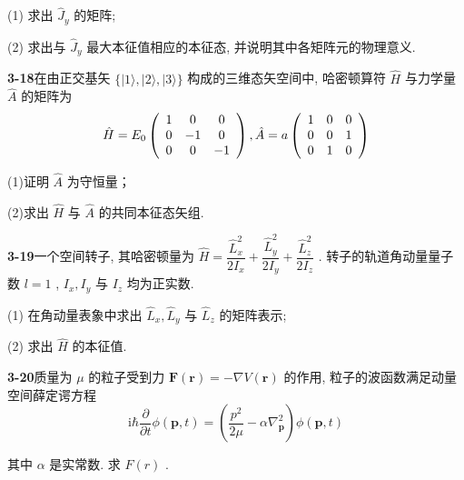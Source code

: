 (1) 求出 $\displaystyle \hat{J}_y$ 的矩阵;

(2) 求出与 $\displaystyle \hat{J}_y$ 最大本征值相应的本征态, 并说明其中各矩阵元的物理意义.

\vfill

\newpage

\textbf{3-18}\quad 在由正交基矢 $\displaystyle \{|1\rangle, |2\rangle, |3\rangle\}$ 构成的三维态矢空间中, 哈密顿算符 $\displaystyle \hat{H}$ 与力学量 $\displaystyle \hat{A}$ 的矩阵为
$$
\hat {H} = E _ {0} \left( \begin{array}{c c c} 1 & 0 & 0 \\ 0 & - 1 & 0 \\ 0 & 0 & - 1 \end{array} \right), \hat {A} = a \left( \begin{array}{c c c} 1 & 0 & 0 \\ 0 & 0 & 1 \\ 0 & 1 & 0 \end{array} \right)
$$

(1)证明 $\displaystyle \hat{A}$ 为守恒量；

(2)求出 $\displaystyle \hat{H}$ 与 $\displaystyle \hat{A}$ 的共同本征态矢组.

\vfill

\newpage

\textbf{3-19}\quad 一个空间转子, 其哈密顿量为 $\displaystyle \hat{H} = \dfrac{\hat{L}_x^2}{2I_x} + \dfrac{\hat{L}_y^2}{2I_y} + \dfrac{\hat{L}_z^2}{2I_z}$ . 转子的轨道角动量量子数 $\displaystyle l = 1$ , $\displaystyle I_x, I_y$ 与 $\displaystyle I_z$ 均为正实数.

(1) 在角动量表象中求出 $\displaystyle \hat{L}_x, \hat{L}_y$ 与 $\displaystyle \hat{L}_z$ 的矩阵表示;

(2) 求出 $\displaystyle \hat{H}$ 的本征值.

\vfill

\newpage

\textbf{3-20}\quad 质量为 $\displaystyle \mu$ 的粒子受到力 $\displaystyle \boldsymbol{F}(\boldsymbol{r}) = -\nabla V(\boldsymbol{r})$ 的作用, 粒子的波函数满足动量空间薛定谔方程
$$
\mathrm{i} \hbar \dfrac {\partial}{\partial t} \phi (\boldsymbol {p}, t) = \left(\dfrac {p ^ {2}}{2 \mu} - \alpha \nabla_ {\boldsymbol {p}} ^ {2}\right) \phi (\boldsymbol {p}, t)
$$

其中 $\displaystyle \alpha$ 是实常数. 求 $\displaystyle F(r)$ .

\vfill

\newpage


